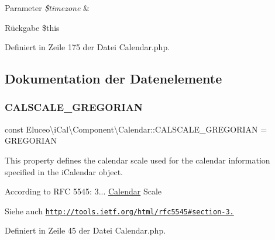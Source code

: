 \begin{DoxyParams}{Parameter}
{\em \$timezone} & \\
\hline
\end{DoxyParams}
\begin{DoxyReturn}{Rückgabe}
\$this 
\end{DoxyReturn}


Definiert in Zeile 175 der Datei Calendar.\+php.



\subsection{Dokumentation der Datenelemente}
\mbox{\label{class_eluceo_1_1i_cal_1_1_component_1_1_calendar_a2172d47e85d1940456987e323f586ef6}} 
\subsubsection{\texorpdfstring{C\+A\+L\+S\+C\+A\+L\+E\+\_\+\+G\+R\+E\+G\+O\+R\+I\+AN}{CALSCALE\_GREGORIAN}}
{\footnotesize\ttfamily const Eluceo\textbackslash{}i\+Cal\textbackslash{}\+Component\textbackslash{}\+Calendar\+::\+C\+A\+L\+S\+C\+A\+L\+E\+\_\+\+G\+R\+E\+G\+O\+R\+I\+AN = \textquotesingle{}G\+R\+E\+G\+O\+R\+I\+AN\textquotesingle{}}

This property defines the calendar scale used for the calendar information specified in the i\+Calendar object.

According to R\+FC 5545\+: 3... \mbox{\hyperlink{class_eluceo_1_1i_cal_1_1_component_1_1_calendar}{Calendar}} Scale

\begin{DoxySeeAlso}{Siehe auch}
\href{http://tools.ietf.org/html/rfc5545#section-3.7}{\tt http\+://tools.\+ietf.\+org/html/rfc5545\#section-\/3.} 
\end{DoxySeeAlso}


Definiert in Zeile 45 der Datei Calendar.\+php.

\mbox{\label{class_eluceo_1_1i_cal_1_1_component_1_1_calendar_a2bf3310558bd065e0b4fa2dde21a23b4}} 
